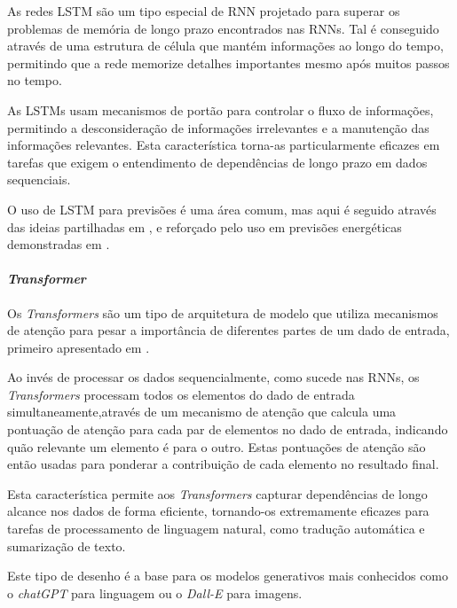 As redes \gls{LSTM} são um tipo especial de \gls{RNN} projetado para superar os problemas de memória de longo prazo encontrados nas \gls{RNN}s. Tal é conseguido através de uma estrutura de célula que mantém informações ao longo do tempo, permitindo que a rede memorize detalhes importantes mesmo após muitos passos no tempo.\par
As \gls{LSTM}s usam mecanismos de portão para controlar o fluxo de informações, permitindo a desconsideração de informações irrelevantes e a manutenção das informações relevantes. Esta característica torna-as particularmente eficazes em tarefas que exigem o entendimento de dependências de longo prazo em dados sequenciais.\par


O uso de \gls{LSTM} para previsões é uma área comum, mas aqui é seguido através das ideias partilhadas em \cite{Hewamalage2021}, e reforçado pelo uso em previsões energéticas demonstradas em \cite{Costa2022}.\par


\paragraph{\textit{Transformer}\label{se:transformer_sec}}
\text{ }  \par

Os \textit{Transformers} são um tipo de arquitetura de modelo que utiliza mecanismos de atenção para pesar a importância de diferentes partes de um dado de entrada, primeiro apresentado em \cite{Vaswani2017}.\par
Ao invés de processar os dados sequencialmente, como sucede nas RNNs, os \textit{Transformers} processam todos os elementos do dado de entrada simultaneamente,através de um mecanismo de atenção que calcula uma pontuação de atenção para cada par de elementos no dado de entrada, indicando quão relevante um elemento é para o outro. Estas pontuações de atenção são então usadas para ponderar a contribuição de cada elemento no resultado final.\par
Esta característica permite aos \textit{Transformers} capturar dependências de longo alcance nos dados de forma eficiente, tornando-os extremamente eficazes para tarefas de processamento de linguagem natural, como tradução automática e sumarização de texto.\par
Este tipo de desenho é a base para os modelos generativos mais conhecidos como o \textit{chatGPT} para linguagem ou o \textit{Dall-E} para imagens.\par




